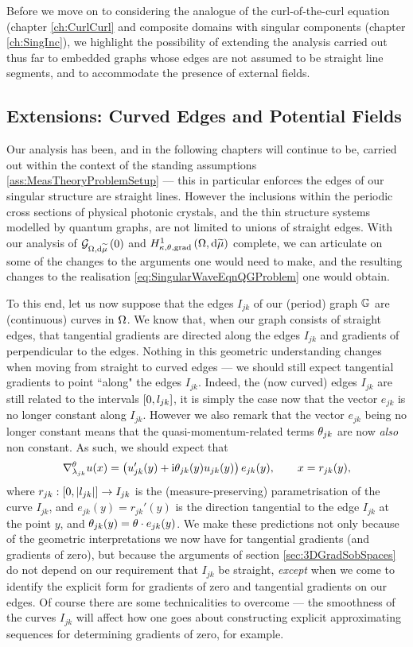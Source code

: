 Before we move on to considering the analogue of the curl-of-the-curl equation (chapter \ref{ch:CurlCurl} and composite domains with singular components (chapter \ref{ch:SingInc}), we highlight the possibility of extending the analysis carried out thus far to embedded graphs whose edges are not assumed to be straight line segments, and to accommodate the presence of external fields.

\subsection{Extensions: Curved Edges and Potential Fields} \label{ssec:CurvedEdges}
Our analysis has been, and in the following chapters will continue to be, carried out within the context of the standing assumptions \ref{ass:MeasTheoryProblemSetup} --- this in particular enforces the edges of our singular structure are straight lines.
However the inclusions within the periodic cross sections of physical photonic crystals, and the thin structure systems modelled by quantum graphs, are not limited to unions of straight edges.
With our analysis of $\mathcal{G}_{ \Omega, \mathrm{d}\widetilde{\mu}}\left( 0 \right)$ and $H^1_{\kappa,\theta,\mathrm{grad}}\left( \Omega, \mathrm{d}\widetilde{\mu} \right)$ complete, we can articulate on some of the changes to the arguments one would need to make, and the resulting changes to the realisation \eqref{eq:SingularWaveEqnQGProblem} one would obtain.

To this end, let us now suppose that the edges $I_{jk}$ of our (period) graph $\mathbb{G}$ are (continuous) curves in $\Omega$.
We know that, when our graph consists of straight edges, that tangential gradients are directed along the edges $I_{jk}$ and gradients of perpendicular to the edges.
Nothing in this geometric understanding changes when moving from straight to curved edges --- we should still expect tangential gradients to point ``along" the edges $I_{jk}$.
Indeed, the (now curved) edges $I_{jk}$ are still related to the intervals $\left[ 0,l_{jk} \right]$, it is simply the case now that the vector $e_{jk}$ is no longer constant along $I_{jk}$.
However we also remark that the vector $e_{jk}$ being no longer constant means that the quasi-momentum-related terms $\theta_{jk}$ are now \emph{also} non constant.
As such, we should expect that
\begin{align*}
	\nabla^{\theta}_{\lambda_{jk}}u(x) = \left(  u_{jk}'(y) + \mathrm{i}\theta_{jk}(y) u_{jk}(y) \right)e_{jk}(y),
	\qquad x = r_{jk}(y),
\end{align*}
where $r_{jk}:\left[ 0,\left\lvert l_{jk} \right\rvert \right]\rightarrow I_{jk}$ is the (measure-preserving) parametrisation of the curve $I_{jk}$, and $e_{jk}(y) = r_{jk}'(y)$ is the direction tangential to the edge $I_{jk}$ at the point $y$, and $\theta_{jk}(y)=\theta\cdot e_{jk}(y)$.
We make these predictions not only because of the geometric interpretations we now have for tangential gradients (and gradients of zero), but because the arguments of section \ref{sec:3DGradSobSpaces} do not depend on our requirement that $I_{jk}$ be straight, \emph{except} when we come to identify the explicit form for gradients of zero and tangential gradients on our edges.
Of course there are some technicalities to overcome --- the smoothness of the curves $I_{jk}$ will affect how one goes about constructing explicit approximating sequences for determining gradients of zero, for example.

